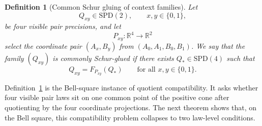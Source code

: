 \documentclass[11pt]{article}
\numberwithin{equation}{section}
\newcommand{\SPD}{\mathrm{SPD}}
\theoremstyle{thmcompact}
\newtheorem{definition}[theorem]{Definition}
\theoremstyle{remark}
\begin{document}
\begin{definition}[Common Schur gluing of context families]\label{def:common-schur-gluing}
Let
\[
Q_{xy}\in\SPD(2),
\qquad x,y\in\{0,1\},
\]
be four visible pair precisions, and let
\[
P_{xy}:\mathbb R^4\to\mathbb R^2
\]
select the coordinate pair $(A_x,B_y)$ from $(A_0,A_1,B_0,B_1)$. We say that the family $(Q_{xy})$ is \emph{commonly Schur-glued} if there exists $Q_\ast\in\SPD(4)$ such that
\begin{equation}\label{eq:common-schur-gluing}
Q_{xy}=F_{P_{xy}}(Q_\ast)
\qquad\text{for all }x,y\in\{0,1\}.
\end{equation}
\end{definition}

Definition~\ref{def:common-schur-gluing} is the Bell-square instance of quotient compatibility. It asks whether four visible pair laws sit on one common point of the positive cone after quotienting by the four coordinate projections. The next theorem shows that, on the Bell square, this compatibility problem collapses to two law-level conditions.
\end{document}
